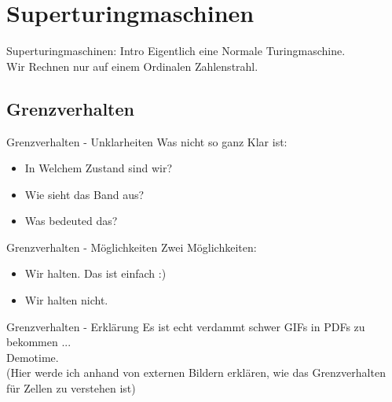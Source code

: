 \section{Superturingmaschinen}

\begin{frame}[c]{Superturingmaschinen: Intro}
    \Large
    Eigentlich eine Normale Turingmaschine. \\
    \pause
    Wir Rechnen nur auf einem Ordinalen Zahlenstrahl.
\end{frame}

\subsection{Grenzverhalten}

\begin{frame}[c]{Grenzverhalten - Unklarheiten}
    \Large
    Was nicht so ganz Klar ist:
    \begin{itemize}
            \pause
        \item In Welchem Zustand sind wir?
            \pause
        \item Wie sieht das Band aus?
            \pause
        \item Was bedeuted das?
    \end{itemize}
\end{frame}


\begin{frame}[c]{Grenzverhalten - Möglichkeiten}
    \Large
    Zwei Möglichkeiten:
    \begin{itemize}
            \pause
        \item Wir halten.
            \pause
            Das ist einfach :)
            \pause
        \item Wir halten nicht.
    \end{itemize}
\end{frame}


\begin{frame}[c]{Grenzverhalten - Erklärung}
    \Large
    \pause
    Es ist echt verdammt schwer GIFs in PDFs zu bekommen ... \\
    \pause
    Demotime. \\
    \pause
    { \small
    (Hier werde ich anhand von externen Bildern erklären, wie das Grenzverhalten für Zellen zu verstehen ist)
    }
\end{frame}


